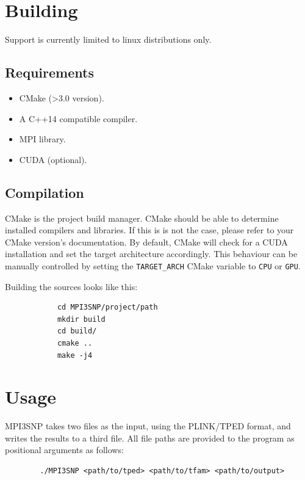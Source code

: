 \documentclass[12pt,hidelinks]{article}
\begin{document}
\section{Building}
    Support is currently limited to linux distributions only.

    \subsection{Requirements}
        \begin{itemize}
            \item CMake (>3.0 version).
            \item A C++14 compatible compiler.
            \item MPI library.
            \item CUDA (optional).
        \end{itemize}
        
    \subsection{Compilation}
        CMake is the project build manager. CMake should be able to determine 
        installed compilers and libraries. If this is is not the case, please 
        refer to your CMake version's documentation. By default, CMake will 
        check for a CUDA installation and set the target architecture 
        accordingly. This behaviour can be manually controlled by setting the 
        \linebreak \texttt{TARGET\_ARCH} CMake variable to \texttt{CPU} or 
        \texttt{GPU}.

        Building the sources looks like this:
        \begin{verbatim}
            cd MPI3SNP/project/path
            mkdir build
            cd build/
            cmake ..
            make -j4
        \end{verbatim}
\clearpage
\section{Usage}
    MPI3SNP takes two files as the input, using the PLINK/TPED format, and 
    writes the results to a third file. All file paths are provided to the 
    program as positional arguments as follows:
    
    \begin{verbatim}
        ./MPI3SNP <path/to/tped> <path/to/tfam> <path/to/output>
    \end{verbatim}
\end{document}

